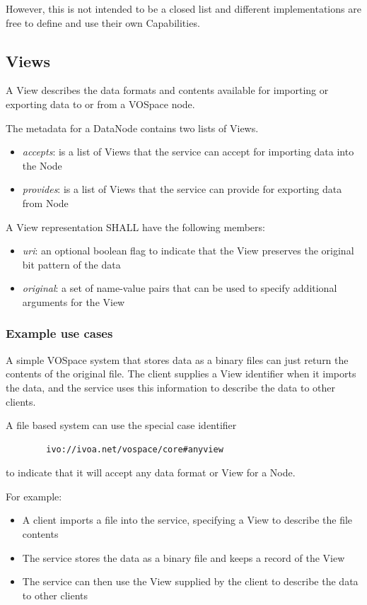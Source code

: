 \documentclass[11pt,a4paper]{ivoa}
\begin{document}
However, this is not intended to be a closed list and different implementations are free to define and use their own Capabilities.

\subsection{Views}
\label{subsec:views}
A View describes the data formats and contents available for importing or exporting data to or from a VOSpace node.

The metadata for a DataNode contains two lists of Views.

\begin{itemize}
    \item \emph{accepts}: is a list of Views that the service can accept for importing data into the Node
    \item \emph{provides}: is a list of Views that the service can provide for exporting data from Node
\end{itemize}

A View representation SHALL have the following members:

\begin{itemize}
    \item \emph{uri}: an optional boolean flag to indicate that the View preserves the original bit pattern of the data
    \item \emph{original}: a set of name-value pairs that can be used to specify additional arguments for the View
\end{itemize}

\subsubsection{Example use cases}
\label{subsubsec:example use cases}
A simple VOSpace system that stores data as a binary files can just return the contents of the original file. The client supplies a View identifier when it imports the data, and the service uses this information to describe the data to other clients.

A file based system can use the special case identifier
\begin{verbatim}
        ivo://ivoa.net/vospace/core#anyview
\end{verbatim}
to indicate that it will accept any data format or View for a Node.

For example:

\begin{itemize}
    \item A client imports a file into the service, specifying a View to describe the file contents
    \item The service stores the data as a binary file and keeps a record of the View
    \item The service can then use the View supplied by the client to describe the data to other clients
\end{itemize}
\end{document}
